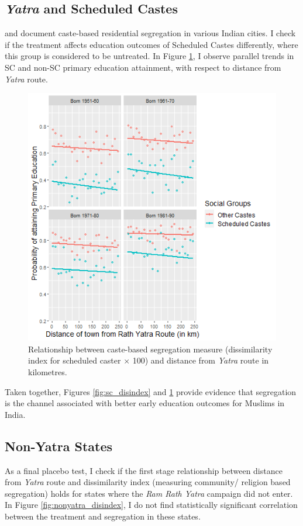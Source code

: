 \documentclass{article}
\begin{document}
\subsection{\textit{Yatra} and Scheduled Castes}
\cite{adukia.2018} and \cite{bharathi2018isolated} document caste-based residential segregation in various Indian cities. I check if the treatment affects education outcomes of Scheduled Castes differently, where this group is considered to be untreated. In Figure \ref{fig:li_pri_sc}, I observe parallel trends in SC and non-SC primary education attainment, with respect to distance from \textit{Yatra} route.  

\begin{figure}[H]
    \centering
    \includegraphics[scale = 0.7]{images/graph_li_pri_sc.png}
    \caption{Relationship between caste-based segregation measure (dissimilarity index for scheduled caster $\times$ 100) and distance from \textit{Yatra} route in kilometres.}
    \label{fig:li_pri_sc}
\end{figure}

Taken together, Figures \ref{fig:sc_disindex} and \ref{fig:li_pri_sc} provide evidence that segregation is the channel associated with better early education outcomes for Muslims in India.

\subsection{Non-Yatra States}
As a final placebo test, I check if the first stage relationship between distance from \textit{Yatra} route and dissimilarity index (measuring community/ religion based segregation) holds for states where the \textit{Ram Rath Yatra} campaign did not enter. In Figure \ref{fig:nonyatra_disindex}, I do not find statistically significant correlation between the treatment and segregation in these states. 
\end{document}
